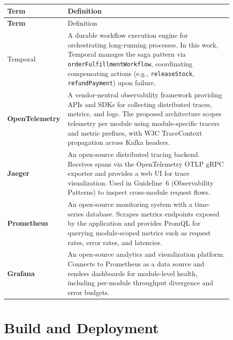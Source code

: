 \begin{longtable}{>{\bfseries}p{0.20\linewidth} p{0.72\linewidth}}
\toprule
Term & Definition \\
\midrule
\endfirsthead
\toprule
Term & Definition \\
\midrule
\endhead
\bottomrule
\endfoot

Temporal &
A durable workflow execution engine for orchestrating long-running processes. In this work, Temporal manages the saga pattern via \texttt{orderFulfillmentWorkflow}, coordinating compensating actions (e.g., \texttt{releaseStock}, \texttt{refundPayment}) upon failure. \\

OpenTelemetry &
A vendor-neutral observability framework providing APIs and SDKs for collecting distributed traces, metrics, and logs. The proposed architecture scopes telemetry per module using module-specific tracers and metric prefixes, with W3C TraceContext propagation across Kafka headers. \\

Jaeger &
An open-source distributed tracing backend. Receives spans via the OpenTelemetry OTLP gRPC exporter and provides a web UI for trace visualization. Used in Guideline~6 (Observability Patterns) to inspect cross-module request flows. \\

Prometheus &
An open-source monitoring system with a time-series database. Scrapes metrics endpoints exposed by the application and provides PromQL for querying module-scoped metrics such as request rates, error rates, and latencies. \\

Grafana &
An open-source analytics and visualization platform. Connects to Prometheus as a data source and renders dashboards for module-level health, including per-module throughput divergence and error budgets. \\

\end{longtable}

\section{Build and Deployment}


